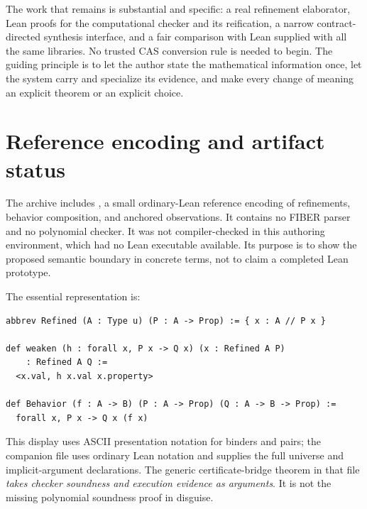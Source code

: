 \documentclass[11pt,letterpaper]{article}
\theoremstyle{definition}\newtheorem{definition}[theorem]{Definition}
\newcommand{\code}[1]{\texttt{\detokenize{#1}}}
\begin{document}
The work that remains is substantial and specific: a real refinement elaborator, Lean proofs for the computational checker and its reification, a narrow contract-directed synthesis interface, and a fair comparison with Lean supplied with all the same libraries. No trusted CAS conversion rule is needed to begin. The guiding principle is to let the author state the mathematical information once, let the system carry and specialize its evidence, and make every change of meaning an explicit theorem or an explicit choice.

\appendix
\section{Reference encoding and artifact status}\label{app:encoding}
The archive includes \code{CoreEncoding.lean}, a small ordinary-Lean reference encoding of refinements, behavior composition, and anchored observations. It contains no FIBER parser and no polynomial checker. It was not compiler-checked in this authoring environment, which had no Lean executable available. Its purpose is to show the proposed semantic boundary in concrete terms, not to claim a completed Lean prototype.

The essential representation is:
\begin{lstlisting}
abbrev Refined (A : Type u) (P : A -> Prop) := { x : A // P x }

def weaken (h : forall x, P x -> Q x) (x : Refined A P)
    : Refined A Q :=
  <x.val, h x.val x.property>

def Behavior (f : A -> B) (P : A -> Prop) (Q : A -> B -> Prop) :=
  forall x, P x -> Q x (f x)
\end{lstlisting}
This display uses ASCII presentation notation for binders and pairs; the companion file uses ordinary Lean notation and supplies the full universe and implicit-argument declarations. The generic certificate-bridge theorem in that file \emph{takes checker soundness and execution evidence as arguments}. It is not the missing polynomial soundness proof in disguise.
\end{document}

